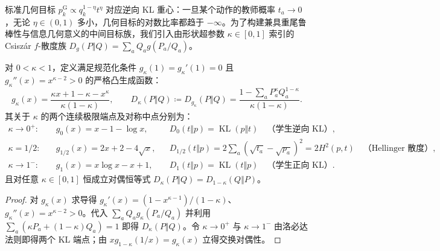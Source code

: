 \documentclass[lang=cn,scheme=chinese,openany]{../book/elegantbook}
\newcommand{\KL}{\operatorname{KL}}
\begin{document}
标准几何目标 $p_k^{\mathrm G}\propto q_k^{1-\eta}t^\eta$ 对应逆向 KL 重心：一旦某个动作的教师概率 $t_a\to 0$，无论 $\eta\in(0,1)$ 多小，几何目标的对数比率都趋于 $-\infty$。为了构建兼具重尾鲁棒性与信息几何意义的中间目标族，我们引入由形状超参数 $\kappa\in[0,1]$ 索引的 Csisz\'ar $f$-散度族 $D_g(P\Vert Q)=\sum_a Q_a g(P_a/Q_a)$。

\begin{theorem}
\label{thm:divergence-map-power}
对 $0<\kappa<1$，定义满足规范化条件 $g_\kappa(1)=g_\kappa'(1)=0$ 且 $g_\kappa''(x)=x^{\kappa-2}>0$ 的严格凸生成函数：
\begin{equation}
 g_\kappa(x)=\frac{\kappa x+1-\kappa-x^\kappa}{\kappa(1-\kappa)},
 \qquad
 D_\kappa(P\Vert Q)\coloneqq D_{g_\kappa}(P\Vert Q)
 =\frac{1-\sum_a P_a^\kappa Q_a^{1-\kappa}}{\kappa(1-\kappa)}.
 \label{eq:divergence-map-power-generator}
\end{equation}
其关于 $\kappa$ 的两个连续极限端点及对称中点分别为：
\begin{align}
 \kappa\to 0^+:&\quad g_0(x)=x-1-\log x, && D_0(t\Vert p)=\KL(p\Vert t)\quad\text{（学生逆向 KL）},\\
 \kappa=1/2:&\quad g_{1/2}(x)=2x+2-4\sqrt{x}, && D_{1/2}(t\Vert p)=2\sum_a(\sqrt{t_a}-\sqrt{p_a})^2=2H^2(p,t)\quad\text{（Hellinger 散度）},\\
 \kappa\to 1^-:&\quad g_1(x)=x\log x-x+1, && D_1(t\Vert p)=\KL(t\Vert p)\quad\text{（学生正向 KL）}.
 \label{eq:divergence-map-kl-endpoints}
\end{align}
且对任意 $\kappa\in[0,1]$ 恒成立对偶恒等式 $D_\kappa(P\Vert Q)=D_{1-\kappa}(Q\Vert P)$。
\end{theorem}
\begin{proof}
对 $g_\kappa(x)$ 求导得 $g_\kappa'(x)=(1-x^{\kappa-1})/(1-\kappa)$、$g_\kappa''(x)=x^{\kappa-2}>0$。代入 $\sum_a Q_a g_\kappa(P_a/Q_a)$ 并利用 $\sum_a(\kappa P_a+(1-\kappa)Q_a)=1$ 即得 $D_\kappa(P\Vert Q)$。令 $\kappa\to 0^+$ 与 $\kappa\to 1^-$ 由洛必达法则即得两个 KL 端点；由 $x g_{1-\kappa}(1/x)=g_\kappa(x)$ 立得交换对偶性。
\end{proof}
\end{document}

